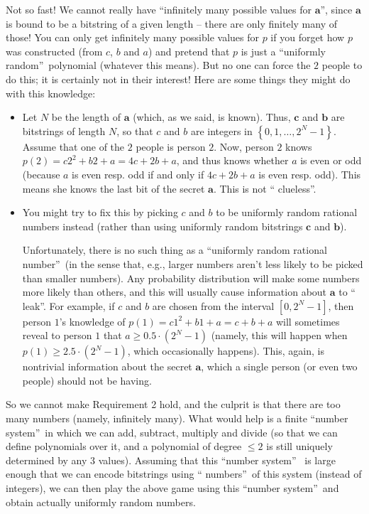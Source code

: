 \documentclass[numbers=enddot,12pt,final,onecolumn,notitlepage]{scrartcl}%
\numberwithin{exer}{subsection}
\theoremstyle{definition}
\begin{document}
Not so fast! We cannot really have \textquotedblleft infinitely many possible
values for $\mathbf{a}$\textquotedblright, since $\mathbf{a}$ is bound to be a
bitstring of a given length -- there are only finitely many of those! You can
only get infinitely many possible values for $p$ if you forget how $p$ was
constructed (from $c$, $b$ and $a$) and pretend that $p$ is just a
\textquotedblleft uniformly random\textquotedblright\ polynomial (whatever
this means). But no one can force the $2$ people to do this; it is certainly
not in their interest! Here are some things they might do with this knowledge:

\begin{itemize}
\item Let $N$ be the length of $\mathbf{a}$ (which, as we said, is known).
Thus, $\mathbf{c}$ and $\mathbf{b}$ are bitstrings of length $N$, so that $c$
and $b$ are integers in $\left\{  0,1,\ldots,2^{N}-1\right\}  $. Assume that
one of the $2$ people is person $2$. Now, person $2$ knows $p\left(  2\right)
=c2^{2}+b2+a=4c+2b+a$, and thus knows whether $a$ is even or odd (because $a$
is even resp. odd if and only if $4c+2b+a$ is even resp. odd). This means she
knows the last bit of the secret $\mathbf{a}$. This is not \textquotedblleft
clueless\textquotedblright.

\item You might try to fix this by picking $c$ and $b$ to be uniformly random
rational numbers instead (rather than using uniformly random bitstrings
$\mathbf{c}$ and $\mathbf{b}$).

Unfortunately, there is no such thing as a \textquotedblleft uniformly random
rational number\textquotedblright\ (in the sense that, e.g., larger numbers
aren't less likely to be picked than smaller numbers). Any probability
distribution will make some numbers more likely than others, and this will
usually cause information about $\mathbf{a}$ to \textquotedblleft
leak\textquotedblright. For example, if $c$ and $b$ are chosen from the
interval $\left[  0,2^{N}-1\right]  $, then person $1$'s knowledge of
$p\left(  1\right)  =c1^{2}+b1+a=c+b+a$ will sometimes reveal to person $1$
that $a\geq0.5\cdot\left(  2^{N}-1\right)  $ (namely, this will happen when
$p\left(  1\right)  \geq2.5\cdot\left(  2^{N}-1\right)  $, which occasionally
happens). This, again, is nontrivial information about the secret $\mathbf{a}%
$, which a single person (or even two people) should not be having.
\end{itemize}

So we cannot make Requirement 2 hold, and the culprit is that there are too
many numbers (namely, infinitely many). What would help is a finite
\textquotedblleft number system\textquotedblright\ in which we can add,
subtract, multiply and divide (so that we can define polynomials over it, and
a polynomial of degree $\leq2$ is still uniquely determined by any $3$
values). Assuming that this \textquotedblleft number system\textquotedblright%
\ is large enough that we can encode bitstrings using \textquotedblleft
numbers\textquotedblright\ of this system (instead of integers), we can then
play the above game using this \textquotedblleft number
system\textquotedblright\ and obtain actually uniformly random numbers.
\end{document}
